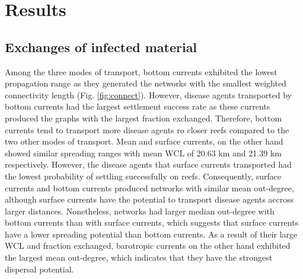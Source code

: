 \section{Results}

\subsection{Exchanges of infected material}

Among the three modes of transport, bottom currents exhibited the lowest propagation range as they generated the networks with the smallest weighted connectivity length (Fig. \ref{fig:connect}). However, disease agents transported by bottom currents had the largest settlement success rate as these currents produced the graphs with the largest fraction exchanged. Therefore, bottom currents tend to transport more disease agents ro closer reefs compared to the two other modes of transport. Mean and surface currents, on the other hand showed similar spreading ranges with mean WCL of 20.63 km and 21.39 km respectively. However, the disease agents that surface currents transported had the lowest probability of settling successfully on reefs. Consequently, surface currents and bottom currents produced networks with similar mean out-degree, although surface currents have the potential to transport disease agents accross larger distances. Nonetheless, networks had larger median out-degree with bottom currents than with surface currents, which suggests that surface currents have a lower spreading potential than bottom currents. As a result of their large WCL and fraction exchanged, barotropic currents on the other hand exhibited the largest mean out-degree, which indicates that they have the strongest dispersal potential. 

